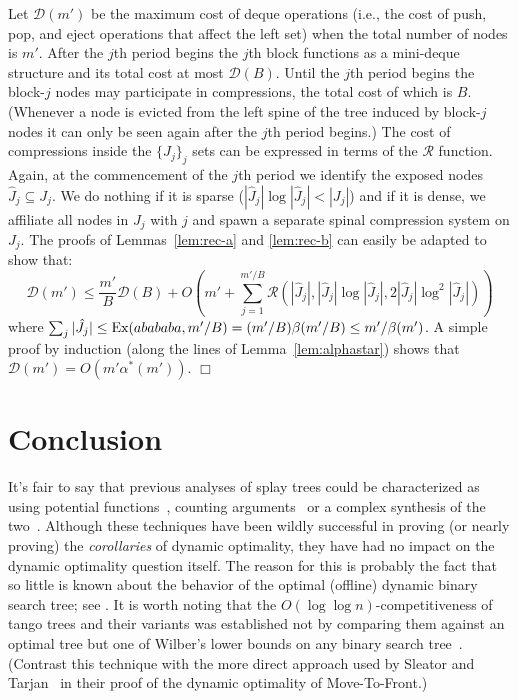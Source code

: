 \documentclass{article}
\newenvironment{proof}{\noindent {\bf Proof:}}{\hfill$\Box$}
\newcommand{\Ex}{\mbox{\rm Ex}}
\newcommand{\Rec}{\mathscr{R}}
\newcommand{\RecDeque}{\mathscr{D}}
\begin{document}
\begin{proof}
Let $\RecDeque(m')$ be the maximum cost of deque operations (i.e., the cost of push, pop, and eject operations that affect the left set)
when the total number of nodes is $m'$.
After the $j$th period begins the $j$th block functions as a mini-deque structure and its total cost at most $\RecDeque(B)$.
Until the $j$th period begins the block-$j$ nodes may participate in compressions, the total cost of which is $B$.
(Whenever a node is evicted from the left spine of the tree induced by block-$j$ nodes it can only be seen again
after the $j$th period begins.)
The cost of compressions inside the $\{J_j\}_j$ sets can be expressed in terms of the $\Rec$ function.
Again, at the commencement of the $j$th period we identify the exposed nodes $\hat{J}_j\subseteq J_j$.
We do nothing if it is sparse ($|\hat{J}_j|\log|\hat{J}_j| < |J_j|$) and if it is dense, we affiliate all nodes in $J_j$ with $j$ and spawn a separate
spinal compression system on $J_j$.
The proofs of Lemmas~\ref{lem:rec-a} and \ref{lem:rec-b} can easily be adapted to show that:
\[
\RecDeque(m') \le \frac{m'}{B}\RecDeque(B) + O(m' + \sum_{j=1}^{m'/B} \Rec(|\hat{J}_j|, |\hat{J}_j|\log|\hat{J}_j|, 2|\hat{J}_j|\log^2 |\hat{J}_j|))
\]
\noindent where $\sum_{j} |\hat{J}_j| \le \Ex(abababa, m'/B) = (m'/B)\beta(m'/B) \le m'/\beta(m')$.
A simple proof by induction (along the lines of Lemma~\ref{lem:alphastar}) shows that $\RecDeque(m') = O(m'\alpha^*(m'))$.
\end{proof}

\section{Conclusion}\label{sect:conclusion}

It's fair to say that previous analyses of splay trees could be characterized
as using potential functions~\cite{ST85,Georg04}, counting 
arguments~\cite{Tar85,Lucas91,Sundar92,Elmasry04b} or a complex synthesis 
of the two~\cite{ColeEtal00,Cole00}.  Although these techniques have been wildly successful
in proving (or nearly proving) the {\em corollaries} of dynamic optimality,
they have had no impact on the dynamic optimality question itself.  
The reason for this is probably the fact that so little is known about the behavior
of the optimal (offline) dynamic binary search tree; see \cite{Lucas88,BCK03}.
It is worth noting that the $O(\log\log n)$-competitiveness of tango trees and their
variants \cite{DHIP04,WDS06,Georg05} was established not by comparing them against
an optimal tree but one of Wilber's lower bounds on any binary search tree~\cite{Wilber89}.
(Contrast this technique with the more direct approach used by Sleator and Tarjan~\cite{ST85b}
in their proof of the dynamic optimality of Move-To-Front.)
\end{document}
